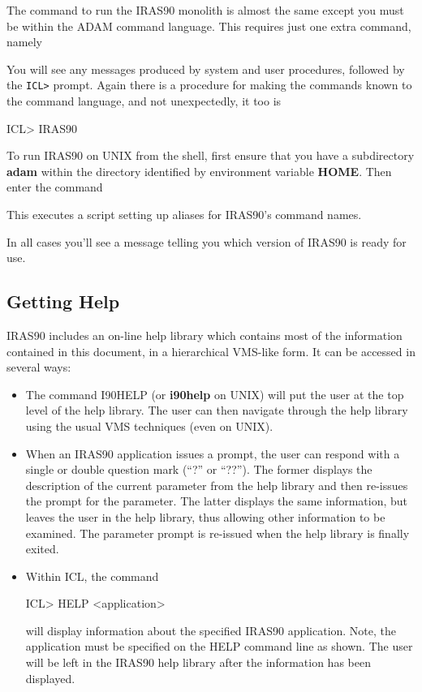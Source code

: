 \documentclass[11pt,nolof,noabs]{starlink}
\begin{document}
The command to run the {\small IRAS90} monolith is almost the same except you
must be within the {\small ADAM} command language.  This requires just one extra
command, namely

\small
{}
\normalsize

You will see any messages produced by system and user procedures, followed
by the \texttt{ICL>} prompt. Again there is a procedure for making the
commands known to the command language, and not unexpectedly, it too is

\small
\begin{terminalv}
ICL> IRAS90
\end{terminalv}
\normalsize

To run {\small IRAS90} on {\small UNIX} from the shell, first ensure that you
have a subdirectory \textbf{adam} within the directory identified by environment
variable \textbf{HOME}. Then enter the command

\small
\begin{terminalv}
\end{terminalv}
\normalsize
This executes a script setting up aliases for {\small IRAS90}'s command names.

In all cases you'll see a message telling you which version of {\small IRAS90}
is ready for use.

\subsection{Getting Help}
{\small IRAS90} includes an on-line help library which contains most of the
information contained in this document, in a hierarchical VMS-like form. It can
be accessed in several ways:
\begin {itemize}
\item The command {\small I90HELP} (or \textbf{i90help} on {\small UNIX}) will put
the user at the top level of the help library. The user can then navigate
through the help library using the usual {\small VMS} techniques (even on
{\small UNIX}). \item When an {\small IRAS90} application issues a prompt, the
user can respond with a single or double question mark (``?'' or ``??''). The
former displays the description of the current parameter from the help library
and then re-issues the prompt for the parameter. The latter displays the same
information, but leaves the user in the help library, thus allowing other
information to be examined. The parameter prompt is re-issued when the help
library is finally exited.
\item Within {\small ICL}, the command

\small
\begin{terminalv}
ICL> HELP <application>
\end{terminalv}
\normalsize
will display information about the specified {\small IRAS90} application. Note,
the application must be specified on the {\small HELP} command line as shown. The user
will be left in the {\small IRAS90} help library after the information has been
displayed.
\end{itemize}
\end{document}
